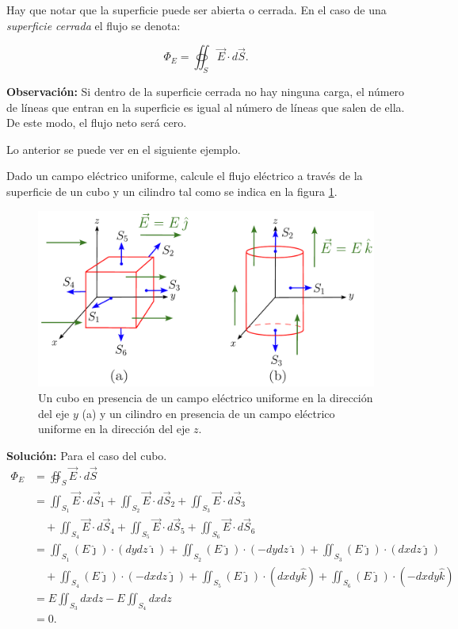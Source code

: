 Hay que notar que la superficie puede ser abierta o cerrada. En el caso de una \textit{superficie cerrada} el flujo se denota:
\begin{shaded}
    $$\Phi_E = \oiint_S \Vec{E} \cdot d\Vec{S}.$$
\end{shaded}

\textbf{Observación:} Si dentro de la superficie cerrada no hay ninguna carga, el número de líneas que entran en la superficie es igual al número de líneas que salen de ella. De este modo, el flujo neto será cero. 

Lo anterior se puede ver en el siguiente ejemplo.

\begin{ejemplo}
    Dado un campo eléctrico uniforme, calcule el flujo eléctrico a través de la superficie de un cubo y un cilindro tal como se indica en la figura \ref{fig:Flujo-E}.

\begin{figure}[H]
    \centering
    \includegraphics[scale = 0.6]{Figuras/Ej-Flujo-Electrico.pdf}
    \caption{Un cubo en presencia de un campo eléctrico uniforme en la dirección del eje $y$ (a) y un cilindro en presencia de un campo eléctrico uniforme en la dirección del eje $z$.}
    \label{fig:Flujo-E}
\end{figure}

\textbf{Solución:} Para el caso del cubo.
\begin{align*}
    \Phi_E &= \oiint_S \vec{E} \cdot d\vec{S} \\
&= \iint_{S_1} \vec{E} \cdot d\vec{S}_1 +  \iint_{S_2}\vec{E} \cdot d\vec{S}_2 + \iint_{S_3}\vec{E} \cdot d\vec{S}_3 \\
&\quad + \iint_{S_4}\vec{E} \cdot d\vec{S}_4 + \iint_{S_5}\vec{E} \cdot d\vec{S}_5 + \iint_{S_6}\vec{E} \cdot d\vec{S}_6  \\
&= \iint_{S_1} (E \hat{\jmath})\cdot(dydz \hat{\imath}) +  \iint_{S_2} (E \hat{\jmath})\cdot(-dydz \hat{\imath}) + \iint_{S_3} (E \hat{\jmath})\cdot(dxdz \hat{\jmath}) \\
&\quad + \iint_{S_4} (E \hat{\jmath})\cdot(-dxdz \hat{\jmath}) + \iint_{S_5} (E \hat{\jmath})\cdot(dxdy \hat{k}) + \iint_{S_6} (E \hat{\jmath})\cdot(-dxdy \hat{k}) \\
&= E \iint_{S_3} dxdz - E \iint_{S_4} dxdz\\
&= 0.
\end{align*}


\end{ejemplo}
